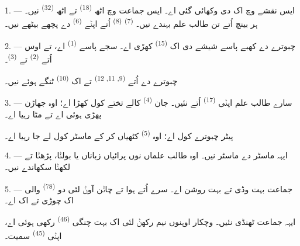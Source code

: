 \VUsaut{2.0mm}
\VUsaut{3.2mm}
\VUsaut{2.6mm}
\VUsaut{3.4mm}
\VUornamento{9pt}
\VUsaut{5.0mm}
\VUsaut{3.0mm}
\VUfilet{16mm}
\VUsaut{5.6mm}

\VUsaut{1.4mm}
\VUsaut{2.2mm}
\VUfilet{20mm}
\VUsaut{6.4mm}

\VUsaut{3.0mm}

1. --- ایس نقشے وچ اک  دی  وکھائی گئی اے۔ ایس
جماعت وچ اٹھ  \textsuperscript{(18)} تے اٹھ 
\textsuperscript{(32)} نیں۔ ہر بینچ اُتے تن طالب علم بہندے نیں۔ 
\textsuperscript{(7)}  \textsuperscript{(8)} اُتے اپݨے
 \textsuperscript{(6)} دے پچھے بیٹھے نیں۔

2. --- چبوترے دے کھبے پاسے شیشے دی اک  \textsuperscript{(15)} کھڑی
اے۔ سجے پاسے  \textsuperscript{(1)} اے، تے اوس اُتے
 \textsuperscript{(2)} تے  \textsuperscript{(3)}۔

چبوترے دے اُتے  \textsuperscript{(9, 11, 12)} تے اک
 \textsuperscript{(10)} ٹنگے ہوئے نیں۔

3. --- سارے طالب علم اپݨی  \textsuperscript{(17)} اُتے نئیں۔ جان
\textsuperscript{(4)} کالے تختے کول کھڑا اے؛ اوہ جھاڑن پھڑی ہوئی اے تے
 مٹا رہیا اے۔

پیٹر چبوترے کول اے؛ اوہ  \textsuperscript{(5)} کٹھیاں کر کے
ماسٹر کول لے جا رہیا اے۔

4. --- ایہہ ماسٹر  دے ماسٹر نیں۔ اوہ طالب علماں نوں پرائیاں
زباناں  یا 
بولݨا، پڑھݨا تے لکھݨا سکھاندے نیں۔

5. --- جماعت بہت وڈی تے بہت روشن اے۔ سرے اُتے ہوا تے چاݨن آوݨ لئی دو
 \textsuperscript{(78)} والی اک چوڑی  تے اک
 اے۔

ایہہ جماعت ٹھنڈی نئیں۔ وچکار اوہنوں نیم رکھݨ لئی اک بہت چنگی
 \textsuperscript{(46)} رکھی ہوئی اے، اپݨی 
\textsuperscript{(45)} سمیت۔


